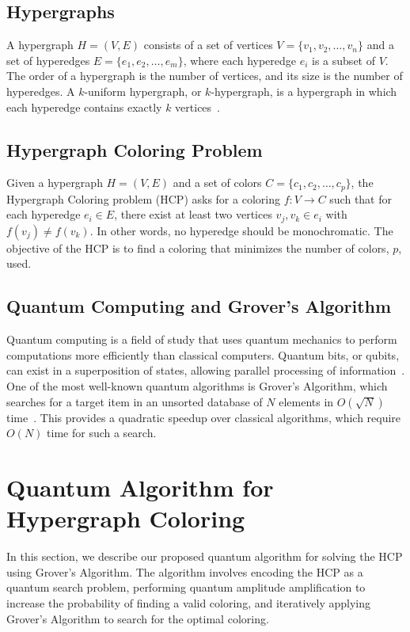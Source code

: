 \subsection{Hypergraphs}\label{subsec:hypergraphs}
A hypergraph $H = (V, E)$ consists of a set of vertices $V = \{v_1, v_2, \dots, v_n\}$ and a set of hyperedges $E = \{e_1, e_2, \dots, e_m\}$, where each hyperedge $e_i$ is a subset of $V$. The order of a hypergraph is the number of vertices, and its size is the number of hyperedges. A $k$-uniform hypergraph, or $k$-hypergraph, is a hypergraph in which each hyperedge contains exactly $k$ vertices~\cite{berge1989hypergraphs}.

\subsection{Hypergraph Coloring Problem}\label{subsec:HCP}
Given a hypergraph $H = (V, E)$ and a set of colors $C = \{c_1, c_2, \dots, c_p\}$, the Hypergraph Coloring problem (HCP) asks for a coloring $f: V \rightarrow C$ such that for each hyperedge $e_i \in E$, there exist at least two vertices $v_j, v_k \in e_i$ with $f(v_j) \neq f(v_k)$. In other words, no hyperedge should be monochromatic. The objective of the HCP is to find a coloring that minimizes the number of colors, $p$, used.

\subsection{Quantum Computing and Grover's Algorithm}\label{subsec:quantum}
Quantum computing is a field of study that uses quantum mechanics to perform computations more efficiently than classical computers. Quantum bits, or qubits, can exist in a superposition of states, allowing parallel processing of information~\cite{nielsen2010quantum}. One of the most well-known quantum algorithms is Grover's Algorithm, which searches for a target item in an unsorted database of $N$ elements in $O(\sqrt{N})$ time~\cite{grover1996fast}. This provides a quadratic speedup over classical algorithms, which require $O(N)$ time for such a search.

\section{Quantum Algorithm for Hypergraph Coloring}\label{sec:algorithm}
In this section, we describe our proposed quantum algorithm for solving the HCP using Grover's Algorithm. The algorithm involves encoding the HCP as a quantum search problem, performing quantum amplitude amplification to increase the probability of finding a valid coloring, and iteratively applying Grover's Algorithm to search for the optimal coloring.

